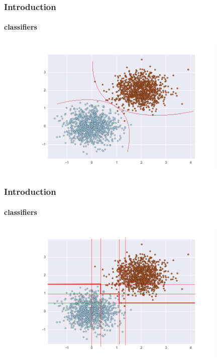 \documentclass[11 pt,t]{beamer}
\begin{document}
\begin{frame}
\frametitle{Introduction}
\framesubtitle{classifiers}
\begin{minipage}[t]{\linewidth}\centering
\begin{figure}
   \includegraphics[width=10cm]{2}
\end{figure}
\end{minipage}
\end{frame}

\begin{frame}
\frametitle{Introduction}
\framesubtitle{classifiers}
\begin{minipage}[t]{\linewidth}\centering
\begin{figure}
   \includegraphics[width=10cm]{3}
\end{figure}
\end{minipage}
\end{frame}
\end{document}
